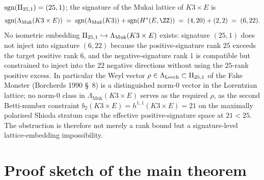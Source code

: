 \begin{theorem*}[Chain-level Fake Monster at $d = 5$]
\begin{enumerate}[label=\textup{(\roman*)}]
$\mathrm{sgn}(\mathrm{II}_{25,1}) = (25, 1)$; the signature of the Mukai lattice of
$K3 \times E$ is
\[
  \Sgnt(\Lambda_{\mathrm{Muk}}(K3 \times E))
  \;=\;
  \Sgnt(\Lambda_{\mathrm{Muk}}(K3)) + \Sgnt(H^*(E, \ZZ))
  \;=\;
  (4, 20) + (2, 2)
  \;=\;
  (6, 22).
\]
No isometric embedding $\mathrm{II}_{25,1} \hookrightarrow
\Lambda_{\mathrm{Muk}}(K3 \times E)$ exists: signature $(25, 1)$
does not inject into signature $(6, 22)$ because the positive-signature
rank $25$ exceeds the target positive rank $6$, and the
negative-signature rank $1$ is compatible but constrained to
inject into the $22$ negative directions without using the $25$-rank
positive excess. In particular the Weyl vector $\rho \in \Lambda_{\mathrm{Leech}}
\subset \mathrm{II}_{25,1}$ of the Fake Monster (Borcherds 1990 \S~$8$)
is a distinguished norm-$0$ vector in the Lorentzian lattice; no
norm-$0$ class in $\Lambda_{\mathrm{Muk}}(K3 \times E)$ serves as
the required $\rho$, as the second Betti-number constraint
$b_2(K3 \times E) = h^{1,1}(K3 \times E) = 21$ on the maximally
polarised Shioda stratum caps the effective positive-signature
space at $21 < 25$. The obstruction is therefore not merely a rank
bound but a signature-level lattice-embedding impossibility.
\end{enumerate}
\end{theorem*}

\section*{Proof sketch of the main theorem}

